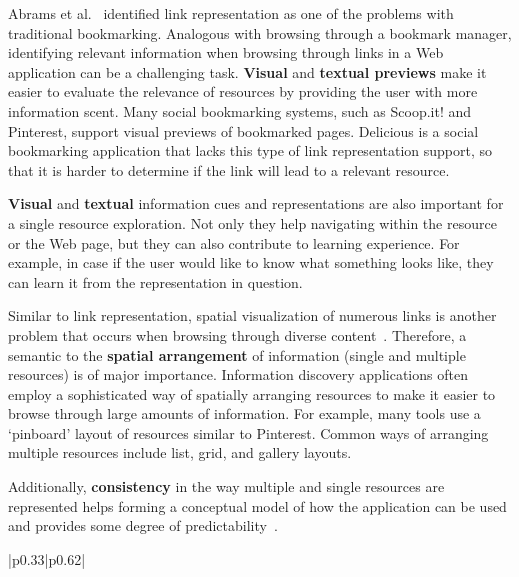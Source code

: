 {{Abrams et al.~\cite{abrams1998information} identified link representation as one of the problems with traditional bookmarking. Analogous with browsing through a bookmark manager, identifying relevant information when browsing through links in a Web application can be a challenging task. \textbf{Visual} and \textbf{textual previews} make it easier to evaluate the relevance of resources by providing the user with more information scent. Many social bookmarking systems, such as Scoop.it! and Pinterest, support visual previews of bookmarked pages. Delicious is a social bookmarking application that lacks this type of link representation support, so that it is harder to determine if the link will lead to a relevant resource.

\textbf{Visual} and \textbf{textual} information cues and representations are also important for a single resource exploration. Not only they help navigating within the resource or the Web page, but they can also contribute to learning experience. For example, in case if the user would like to know what something looks like, they can learn it from the representation in question.  

Similar to link representation, spatial visualization of numerous links is another problem that occurs when browsing through diverse content~\cite{abrams1998information}. Therefore, a semantic to the \textbf{spatial arrangement} of information (single and multiple resources) is of major importance. Information discovery applications often employ a sophisticated way of spatially arranging resources to make it easier to browse through large amounts of information. For example, many tools use a `pinboard' layout of resources similar to Pinterest. Common ways of arranging multiple resources include list, grid, and gallery layouts. 

Additionally, \textbf{consistency} in the way multiple and single resources are represented helps forming a conceptual model of how the application can be used and provides some degree of predictability~\cite{norman2002design}.

\begin{table}[ht!]
\caption{Visual and Spatial Exploration Mechanisms}
\label{table:exploration} 
\begin{tabular}{{|p{0.33\linewidth}|p{0.62\linewidth}|}}


\end{tabular}
\end{table}}}
